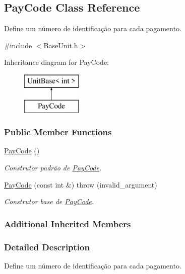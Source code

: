 \hypertarget{classPayCode}{\subsection{Pay\-Code Class Reference}
\label{d0/d34/classPayCode}
}


Define um número de identificação para cada pagamento.  




{\ttfamily \#include $<$Base\-Unit.\-h$>$}

Inheritance diagram for Pay\-Code\-:\begin{figure}[H]
\begin{center}
\leavevmode
\includegraphics[height=2.000000cm]{d0/d34/classPayCode}
\end{center}
\end{figure}
\subsubsection*{Public Member Functions}
\begin{DoxyCompactItemize}
\item 
\hyperlink{classPayCode_ac222821eaa2b803127fad4dd1d4b4bf3}{Pay\-Code} ()
\begin{DoxyCompactList}\small\item\em Construtor padrão de \hyperlink{classPayCode}{Pay\-Code}. \end{DoxyCompactList}\item 
\hyperlink{classPayCode_a919ab6e420b9bd55e8c470ea411aa97e}{Pay\-Code} (const int \&)  throw (invalid\-\_\-argument)
\begin{DoxyCompactList}\small\item\em Construtor base de \hyperlink{classPayCode}{Pay\-Code}. \end{DoxyCompactList}\end{DoxyCompactItemize}
\subsubsection*{Additional Inherited Members}


\subsubsection{Detailed Description}
Define um número de identificação para cada pagamento. 

